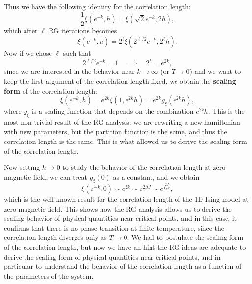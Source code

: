 Thus we have the following identity for the correlation length:
\[
    \frac{1}{2} \xi(e^{-k}, h) = \xi(\sqrt{2} e^{-k}, 2h),
\]
which after \(\ell\) RG iterations becomes
\[
    \xi(e^{-k}, h) = 2^{\ell} \xi(2^{\ell/2} e^{-k}, 2^{\ell} h).
\]
Now if we chose \(\ell\) such that
\[
    2^{\ell/2}e^{-k} = 1 \quad \implies \quad 2^\ell = e^{2k},
\]
since we are interested in the behavior near \(k \to \infty\) (or \(T \to 0\)) and we want to keep the first argument of the correlation length fixed, we obtain the \textbf{scaling form} of the correlation length:
\[
    \xi(e^{-k}, h) = e^{2k} \xi(1, e^{2k} h) = e^{2k} g_\xi(e^{2k} h),
\]
where \(g_\xi\) is a scaling function that depends on the combination \(e^{2k} h\). This is the most non trivial result of the RG analysis: we are rewriting a new hamiltonian with new parameters, but the partition function is the same, and thus the correlation length is the same. This is what allowed us to derive the scaling form of the correlation length.

Now setting \(h \to 0\) to study the behavior of the correlation length at zero magnetic field, we can treat \(g_\xi(0)\) as a constant, and we obtain
\[
    \xi(e^{-k}, 0) \sim e^{2k} \sim e^{2\beta J} \sim e^{\frac{2J}{k_B T}},
\]
which is the well-known result for the correlation length of the 1D Ising model at zero magnetic field. This shows how the RG analysis allows us to derive the scaling behavior of physical quantities near critical points, and in this case, it confirms that there is no phase transition at finite temperature, since the correlation length diverges only as \(T \to 0\). We had to postulate the scaling form of the correlation length, but now we have an hint the RG ideas are adequate to derive the scaling form of physical quantities near critical points, and in particular to understand the behavior of the correlation length as a function of the parameters of the system.
